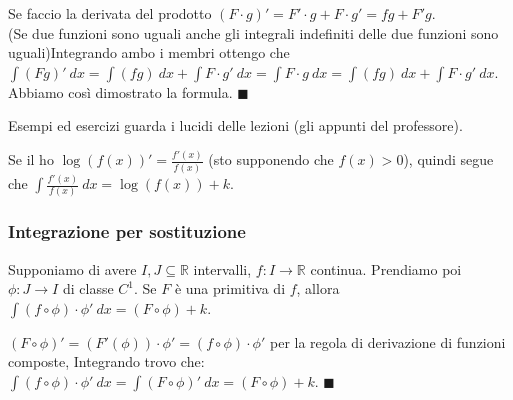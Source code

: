 \begin{demostration}
Se faccio la derivata del prodotto $(F \cdot g)' = F'\cdot g + F\cdot g' = fg + F'g$. \\
(Se due funzioni sono uguali anche gli integrali indefiniti delle due funzioni sono uguali)Integrando ambo i membri ottengo che $\int (Fg)'\:dx = \int (fg)\:dx + \int F\cdot g' \:dx = \int F\cdot g\:dx = \int (fg)\:dx + \int F\cdot g' \:dx$. Abbiamo così dimostrato la formula. $\blacksquare$
\end{demostration}

\hspace{-15pt}Esempi ed esercizi guarda i lucidi delle lezioni (gli appunti del professore).

\begin{observation}
Se il ho $\log(f(x))' = \frac{f'(x)}{f(x)}$ (sto supponendo che $f(x) > 0$), quindi segue che $\int \frac{f'(x)}{f(x)} \:dx = \log(f(x)) + k$.
\end{observation}

\subsubsection{Integrazione per sostituzione}
Supponiamo di avere $I,J \subseteq \mathbb{R}$ intervalli, $f: I \to \mathbb{R}$ continua. Prendiamo poi $\phi: J \to I$ di classe $C^1$. Se $F$ è una primitiva di $f$, allora $\int (f \circ \phi) \cdot \phi' \:dx = (F \circ \phi) + k$.

\begin{demostration}
$(F \circ \phi)' = (F'(\phi)) \cdot \phi' = (f \circ \phi) \cdot \phi'$ per la regola di derivazione di funzioni composte, Integrando trovo che: $\int (f \circ \phi) \cdot \phi' \: dx = \int (F \circ \phi)' \:dx = (F \circ \phi) + k$. $\blacksquare$
\end{demostration}

